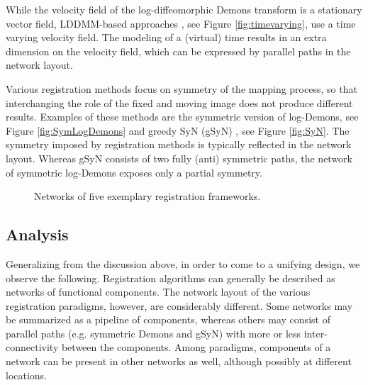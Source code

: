 While the velocity field of the log-diffeomorphic Demons transform
is a stationary vector field, LDDMM-based approaches \cite{Beg:LDDMM}, see Figure
\ref{fig:timevarying}, use a time varying velocity field. The
modeling of a (virtual) time results in an extra dimension on the
velocity field, which can be expressed by parallel paths in the
network layout.

Various registration methods focus on symmetry of the mapping
process, so that interchanging the role of the fixed and moving
image does not produce different results. Examples of these methods
are the symmetric version of log-Demons, see Figure
\ref{fig:SymLogDemons} and greedy SyN (gSyN) \cite{Avants:SyN}, see
Figure \ref{fig:SyN}. The symmetry imposed by registration methods
is typically reflected in the network layout. Whereas gSyN consists
of two fully (anti) symmetric paths, the network of symmetric
log-Demons exposes only a partial symmetry.

\begin{figure*}[!tb]
\centering
{}
\hfil
{} \hfil {}
\hfil
{}
\hfil
{} \caption{Networks of five exemplary registration
frameworks.}\label{fig:networkanalysis}
\end{figure*}

\subsection{Analysis}

Generalizing from the discussion above, in order to come to a
unifying design, we observe the following. Registration algorithms
can generally be described as networks of functional components. The
network layout of the various registration paradigms, however, are
considerably different. Some networks may be summarized as a
pipeline of components, whereas others may consist of parallel paths
(e.g. symmetric Demons and gSyN) with more or less
inter-connectivity between the components. Among paradigms,
components of a network can be present in other networks as well,
although possibly at different locations.

